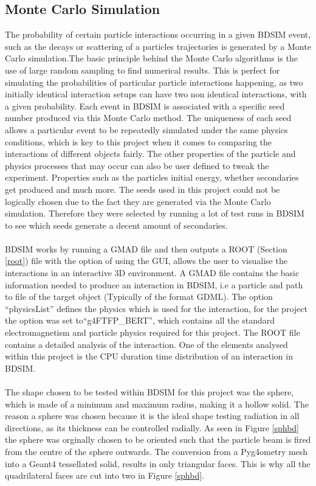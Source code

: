 \documentclass[12pt,a4paper]{article}
\begin{document}
\subsection{Monte Carlo Simulation}
\label{monte}
\noindent The probability of certain particle interactions occurring in a given BDSIM event, such as the decays or scattering of a particles trajectories is generated by a Monte Carlo simulation.The basic principle behind the Monte Carlo algorithms is the use of large random sampling to find numerical results. This is perfect for simulating the probabilities of particular particle interactions happening, as two initially identical interaction setups can have two non identical interactions, with a given probability. Each event in BDSIM is associated with a specific seed number produced via this Monte Carlo method. The uniqueness of each seed allows a particular event to be repeatedly simulated under the same physics conditions, which is key to this project when it comes to comparing the interactions of different objects fairly. The other properties of the particle and physics processes that may occur can also be user defined to tweak the experiment. Properties such as the particles initial energy, whether secondaries get produced and much more. The seeds used in this project could not be logically chosen due to the fact they are generated via the Monte Carlo simulation. Therefore they were selected by running a lot of test runs in BDSIM to see which seeds generate a decent amount of secondaries.
\\\\
BDSIM works by running a GMAD file and then outputs  a ROOT (Section \ref{root}) file with the option of using the GUI, allows the user to visualise the interactions in an interactive 3D environment. A GMAD file contains the basic information needed to produce an interaction in BDSIM, i.e a particle and path to file of the target object (Typically of the format GDML). The option ``physicsList'' defines the physics which is used for the interaction, for the project the option was set to``g4FTFP\_BERT'', which contains all the standard electromagnetism and particle physics required for this project. The ROOT file contains a detailed analysis of the interaction. One of the elements analysed within this project is the CPU duration time distribution of an interaction in BDSIM.
\\\\
The shape chosen to be tested within BDSIM for this project was the sphere, which is made of a minimum and maximum radius, making it a hollow solid. The reason a sphere was chosen because it is the ideal shape testing radiation in all directions, as its thickness can be controlled radially. As seen in Figure \ref{sphbd} the sphere was orginally chosen to be oriented such that the particle beam is fired from the centre of the sphere outwards. The conversion from a Pyg4ometry mesh into a Geant4 tessellated solid, results in only triangular faces. This is why all the quadrilateral faces are cut into two in Figure \ref{sphbd}.
\end{document}
